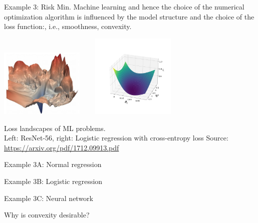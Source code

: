 \begin{vbframe}{Example 3: Risk Min. Machine learning}
and hence the choice of the numerical optimization algorithm is influenced by the model structure and the choice of the loss function:, i.e., smoothness, convexity. 		
\vspace*{-0.5cm}
\begin{center}
		\includegraphics[width=0.3\textwidth]{figure_man/ml_landscape.jpg} ~~~ \includegraphics[width=0.3\textwidth]{figure_man/log_reg.png}
	\begin{footnotesize}
		\newline
		Loss landscapes of ML problems. \\ Left: ResNet-56, right: Logistic regression with cross-entropy loss
		\newline
		Source: \url{https://arxiv.org/pdf/1712.09913.pdf}
	\end{footnotesize}
\end{center}	

\end{vbframe}

\begin{vbframe}{Example 3A: Normal regression}


\end{vbframe}

\begin{vbframe}{Example 3B: Logistic regression}


\end{vbframe}


\begin{vbframe}{Example 3C: Neural network}


\end{vbframe}

\begin{vbframe}{Why is convexity desirable?}

\end{vbframe}

\endlecture

